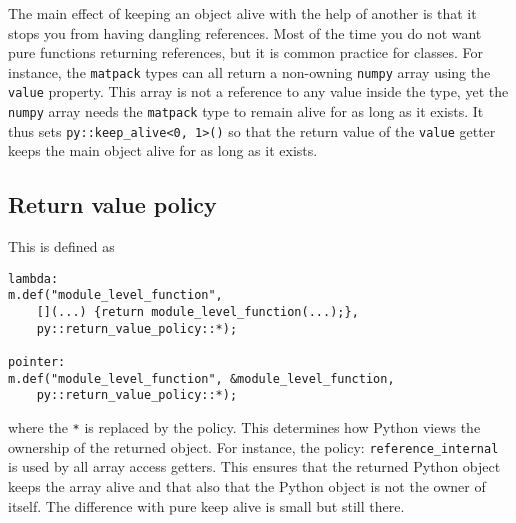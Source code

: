 The main effect of keeping an object alive with the help of another is that it stops you from having dangling references.
Most of the time you do not want pure functions returning references, but it is common practice for classes.  For instance,
the \verb|matpack| types can all return a non-owning \verb|numpy| array using the \verb|value| property.  This array is not
a reference to any value inside the type, yet the \verb|numpy| array needs the \verb|matpack| type to remain alive for as long
as it exists.  It thus sets \verb|py::keep_alive<0, 1>()| so that the return value of the \verb|value| getter keeps the main
object alive for as long as it exists.

\subsection{Return value policy}
This is defined as 
\begin{verbatim}
lambda:
m.def("module_level_function",
    [](...) {return module_level_function(...);},
    py::return_value_policy::*);

pointer:
m.def("module_level_function", &module_level_function,
    py::return_value_policy::*);
\end{verbatim}
where the \verb|*| is replaced by the policy.  This determines how Python views the ownership of the returned object.  For instance,
the policy: \verb|reference_internal| is used by all array access getters. This ensures that the returned Python object keeps the
array alive and that also that the Python object is not the owner of itself.  The difference with pure keep alive is small but still there.

